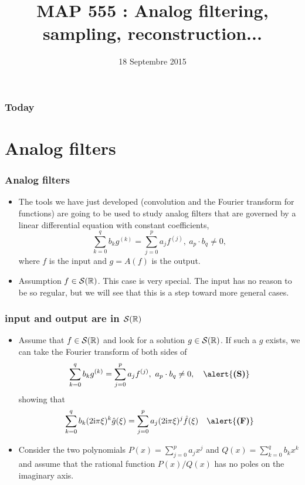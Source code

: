 

\title{MAP 555 : Analog filtering, sampling, reconstruction...}

\date{18 Septembre 2015}
\maketitle



\begin{frame}
\frametitle{Today}
\tableofcontents
\end{frame}

\section{Analog filters}
\begin{frame}
\frametitle{Analog filters}
\begin{itemize}
\item The tools we have just developed (convolution and the Fourier transform for functions) are going to be used to study analog filters that are governed by a linear differential equation with constant coefficients,
$$
\sum_{k=0}^{q}b_{k}g^{(k)}=\sum_{j=0}^{p}a_{j}f^{(j)},\ a_{p}\cdot b_{q}\neq 0,
$$
where $f$ is the input and $g=A(f)$ is the output.
\item  \alert{Assumption}  $f \in \mathcal{S}(\mathbb{R})$. This case is very special. The input has no reason to be so regular, but we will see that this is a step toward more general cases.
\end{itemize}
\end{frame}

\begin{frame}
\frametitle{input and output are in $\mathcal{S}(\mathbb{R})$}
\begin{itemize}
\item Assume that $f\in \mathcal{S}(\mathbb{R})$ and look for a solution $g \in \mathcal{S}(\mathbb{R})$. If such a $g$ exists, we can take the Fourier transform of both sides of
$$
\sum_{k=0}^{q}b_{k}g^{(k)}=\sum_{j=0}^{p}a_{j}f^{(j)},\ a_{p}\cdot b_{q}\neq 0,  \quad \alert{\textbf{(S)}}
$$
showing that
$$
\sum_{k=0}^{q}b_{k}(2\rmi\pi\xi)^{k}\hat{g}(\xi)=\sum_{j=0}^{p}a_{j}(2\rmi\pi\xi)^{j}\hat{f}(\xi) \quad \alert{\textbf{(F)}}
$$
\item Consider the two polynomials $P(x)= \sum_{j=0}^{p}a_{j}x^{j}$ and $Q(x)=\sum_{k=0}^{q}b_{k}x^{k}$
and assume that the rational function $P(x)/Q(x)$ has no poles on the imaginary axis.
\end{itemize}
\end{frame}

